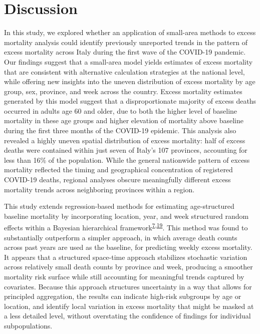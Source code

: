 \documentclass[
]{article}
\begin{document}
\hypertarget{discussion}{%
\section{Discussion}\label{discussion}}

In this study, we explored whether an application of small-area methods to excess mortality analysis could identify previously unreported trends in the pattern of excess mortality across Italy during the first wave of the COVID-19 pandemic. Our findings suggest that a small-area model yields estimates of excess mortality that are consistent with alternative calculation strategies at the national level, while offering new insights into the uneven distribution of excess mortality by age group, sex, province, and week across the country. Excess mortality estimates generated by this model suggest that a disproportionate majority of excess deaths occurred in adults age 60 and older, due to both the higher level of baseline mortality in these age groups and higher elevation of mortality above baseline during the first three months of the COVID-19 epidemic. This analysis also revealed a highly uneven spatial distribution of excess mortality: half of excess deaths were contained within just seven of Italy's 107 provinces, accounting for less than 16\% of the population. While the general nationwide pattern of excess mortality reflected the timing and geographical concentration of registered COVID-19 deaths, regional analyses obscure meaningfully different excess mortality trends across neighboring provinces within a region.

This study extends regression-based methods for estimating age-structured baseline mortality by incorporating location, year, and week structured random effects within a Bayesian hierarchical framework\textsuperscript{\protect\hyperlink{ref-Serfling1963}{7},\protect\hyperlink{ref-Ederer1961}{19}}⁠. This method was found to substantially outperform a simpler approach, in which average death counts across past years are used as the baseline, for predicting weekly excess mortality. It appears that a structured space-time approach stabilizes stochastic variation across relatively small death counts by province and week, producing a smoother mortality risk surface while still accounting for meaningful trends captured by covariates. Because this approach structures uncertainty in a way that allows for principled aggregation, the results can indicate high-risk subgroups by age or location, and identify local variation in excess mortality that might be masked at a less detailed level, without overstating the confidence of findings for individual subpopulations.
\end{document}
